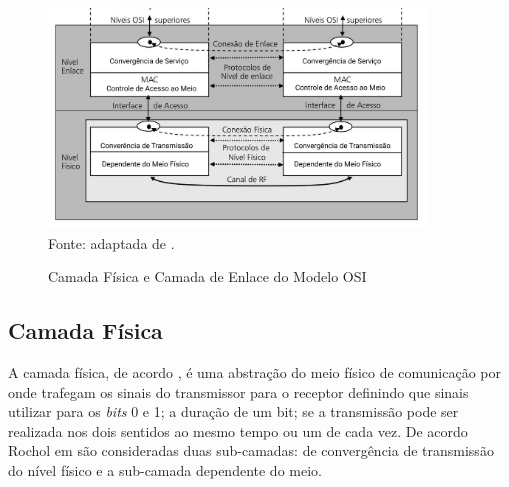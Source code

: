 \begin{figure}[ht]
      \begin{center}
            \caption{Camada Física e Camada de Enlace do Modelo OSI}
            \includegraphics[width=10cm]{./sections/textual/chapters/images/modelo_osi_1e2.png}\\
            Fonte: adaptada de \cite{rochol2018sistemas}.
            \label{fig:modelo_osi_1e2}
      \end{center}
\end{figure}


\subsection{Camada Física}
A camada física, de acordo \cite{tanembaum2011}, é uma abstração do meio físico de comunicação por onde trafegam os sinais do transmissor para o receptor definindo que sinais utilizar para os \emph{bits} 0 e 1; a duração de um bit; se a transmissão pode ser realizada nos dois sentidos ao mesmo tempo ou um de cada vez. De acordo Rochol em \cite{rochol2018sistemas} são consideradas duas sub-camadas: de convergência de transmissão do nível físico e a sub-camada dependente do meio.

